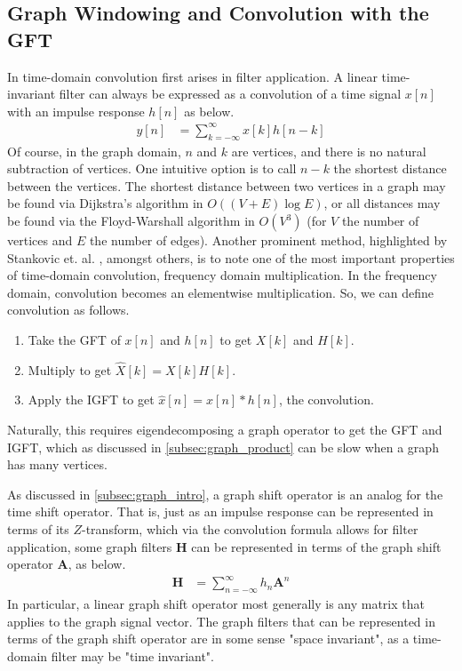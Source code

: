 \documentclass[12pt,a4paper]{article} %
\begin{document}
\subsection{Graph Windowing and Convolution with the GFT}
\label{subsec:graph_convolve}
In time-domain convolution first arises in filter application. A linear time-invariant filter can always be expressed as a convolution of a time signal $x[n]$ with an impulse response $h[n]$ as below.
\begin{align*}
    y[n]&=\sum_{k=-\infty}^\infty x[k]h[n-k]
\end{align*}
Of course, in the graph domain, $n$ and $k$ are vertices, and there is no natural subtraction of vertices. One intuitive option is to call $n-k$ the shortest distance between the vertices. The shortest distance between two vertices in a graph may be found via Dijkstra's algorithm \cite{dijkstra} in $O((V+E)\log E)$, or all distances may be found via the Floyd-Warshall algorithm \cite{floyd} in $O(V^3)$ (for $V$ the number of vertices and $E$ the number of edges). Another prominent method, highlighted by Stankovic et. al. \cite{stankovic}, amongst others, is to note one of the most important properties of time-domain convolution, frequency domain multiplication. In the frequency domain, convolution becomes an elementwise multiplication. So, we can define convolution as follows.
\begin{enumerate}
    \item Take the GFT of $x[n]$ and $h[n]$ to get $X[k]$ and $H[k]$.
    \item Multiply to get $\hat{X}[k]=X[k]H[k]$.
    \item Apply the IGFT to get $\hat{x}[n]=x[n]*h[n]$, the convolution.
\end{enumerate}
Naturally, this requires eigendecomposing a graph operator to get the GFT and IGFT, which as discussed in \ref{subsec:graph_product} can be slow when a graph has many vertices.

As discussed in \ref{subsec:graph_intro}, a graph shift operator is an analog for the time shift operator. That is, just as an impulse response can be represented in terms of its $Z$-transform, which via the convolution formula allows for filter application, some graph filters $\pmb{H}$ can be represented in terms of the graph shift operator $\pmb{A}$, as below.
\begin{align*}
    \pmb{H}&=\sum_{n=-\infty}^\infty h_n\pmb{A}^n
\end{align*}
In particular, a linear graph shift operator most generally is any matrix that applies to the graph signal vector. The graph filters that can be represented in terms of the graph shift operator are in some sense "space invariant", as a time-domain filter may be "time invariant".
\end{document}
